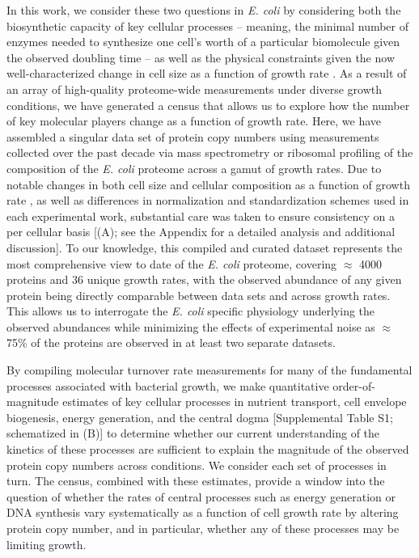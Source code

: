 In this work, we consider these two questions in \textit{E. coli} by considering
both the biosynthetic capacity of key cellular processes --  meaning, the minimal
number of enzymes needed to synthesize one cell's worth of a particular biomolecule
given the observed doubling time --  as well as the physical constraints given the now
well-characterized change in cell size as a function of growth rate
\citep{taheriaraghi2015, si2017, basan2015}. As a result of an array of
high-quality proteome-wide measurements under diverse growth conditions, we have
generated a census that allows us to explore how the number of key molecular
players change as a function of growth rate. Here, we have assembled a singular
data set of protein copy numbers using measurements collected over the past
decade via mass spectrometry \citep{schmidt2016, peebo2015, valgepea2013} or
ribosomal profiling \citep{li2014} of the composition of the \textit{E. coli}
proteome across a gamut of growth rates. Due to notable changes in both cell
size and cellular composition as a function of growth rate \citep{bremer2008,
taheriaraghi2015}, as well as differences in normalization and standardization
schemes used in each experimental work, substantial care was taken to ensure
consistency on a per cellular basis [(A); see the Appendix for a detailed analysis
and additional discussion]. To our knowledge, this compiled and curated dataset
represents the most comprehensive view to date of the \textit{E. coli} proteome,
covering $\approx$ 4000 proteins and 36 unique growth rates, with the observed
abundance of any given protein being directly comparable between data sets and
across growth rates. This allows us to interrogate the \textit{E. coli} specific
physiology underlying the observed abundances while minimizing the effects of
experimental noise as $\approx$ 75\% of the  proteins are observed in at least
two separate datasets.

By compiling molecular turnover rate measurements for many of the fundamental
processes associated with bacterial growth, we make quantitative
order-of-magnitude estimates of key cellular processes in nutrient transport,
cell envelope biogenesis, energy generation, and the central dogma [Supplemental  Table  S1;
schematized in (B)] to determine whether our current understanding of the
kinetics of these processes are sufficient to explain the magnitude of the
observed protein copy numbers across conditions. We consider each set of
processes in turn. The census, combined with these estimates, provide a window
into the question of whether the rates of central processes such as energy
generation or DNA synthesis vary systematically as a function of cell growth
rate by altering protein copy number, and in particular, whether any of these
processes may be limiting growth.

